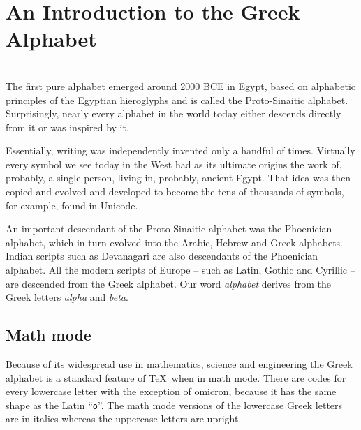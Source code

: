 \section{An Introduction to the Greek Alphabet}
 \\
The first pure alphabet emerged around 2000 BCE in Egypt, based on alphabetic principles of the Egyptian hieroglyphs and is called the Proto-Sinaitic alphabet. Surprisingly, nearly every alphabet in the world today either descends directly from it or was inspired by it.

Essentially, writing was independently invented only a handful of times. Virtually every symbol we see today in the West had as its ultimate origins the work of, probably, a single person, living in, probably, ancient Egypt. That idea was then copied and evolved and developed to become the tens of thousands of symbols, for example, found in Unicode.

An important descendant of the Proto-Sinaitic alphabet was the Phoenician alphabet, which in turn evolved into the Arabic, Hebrew and Greek alphabets. Indian scripts such as Devanagari are also descendants of the Phoenician alphabet. All the modern scripts of Europe -- such as Latin, Gothic and Cyrillic -- are descended from the Greek alphabet. Our word \emph{alphabet} derives from the Greek letters \emph{alpha} and \emph{beta}.

\subsection{Math mode}
Because of its widespread use in mathematics, science and engineering the Greek alphabet is a standard feature of \TeX\ when in math mode. There are codes for every lowercase letter with the exception of omicron, because it has the same shape as the Latin ``\texttt{o}''. The math mode versions of the lowercase Greek letters are in italics whereas the uppercase letters are upright.

